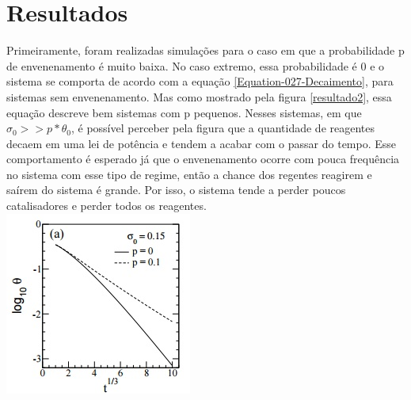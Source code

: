 
\section{Resultados}

Primeiramente, foram realizadas simulações para o caso em que a probabilidade p
de envenenamento é muito baixa. No caso extremo, essa probabilidade é 0 e o
sistema se comporta de acordo com a equação \ref{Equation-027-Decaimento}, para sistemas sem
envenenamento. Mas como mostrado pela figura \ref{resultado2}, essa equação
descreve bem sistemas com p pequenos. Nesses sistemas, em que
$\sigma_0 >> p*\theta_0$, é possível perceber pela figura que a quantidade de
reagentes decaem em uma lei de potência e tendem a acabar com o passar do tempo.
Esse comportamento é esperado já que o envenenamento ocorre com pouca frequência
no sistema com esse tipo de regime, então a chance dos regentes reagirem e
saírem do sistema é grande. Por isso, o sistema tende a perder poucos catalisadores
e perder todos os reagentes.\\

{
	\captionsetup{type=figure}
	\includegraphics[width=\columnwidth]{./figures/052-Resultado.jpg}\\
	\label{resultado2}
}

